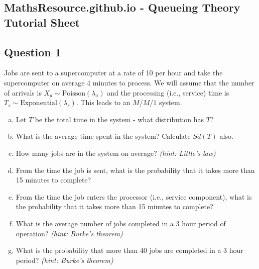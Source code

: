 
\subsection*{MathsResource.github.io - Queueing Theory Tutorial Sheet }
\subsection*{Question 1}
Jobs are sent to a supercomputer at a rate of 10 per hour and take the supercomputer on average 4 minutes to process. We will assume that the number of arrivals is $X_a \sim \text{Poisson}(\lambda_a)$ and the processing (i.e., service) time is $T_s \sim \text{Exponential}(\lambda_s)$. This leads to an $M/M/1$ system.\\[-0.2cm]
\begin{enumerate}[(a)]

\item  Let $T$ be the total time in the system - what distribution has $T$?  \item  What is the average time spent in the system? Calculate $Sd(T)$ also.  \item  How many jobs are in the system on average? \textit{(hint: Little's law)}   \item  From the time the job is sent, what is the probability that it takes more than 15 minutes to complete?   \item  From the time the job enters the processor (i.e., service component), what is the probability that it takes more than 15 minutes to complete?  \item  What is the average number of jobs completed in a 3 hour period of operation? \textit{(hint: Burke's theorem)}  \item  What is the probability that more than 40 jobs are completed in a 3 hour period? \textit{(hint: Burke's theorem)}
\end{enumerate}


